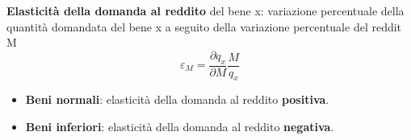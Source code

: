 \documentclass[../main.tex]{subfiles}
\begin{document}
\textbf{Elasticità della domanda al reddito} del bene x: variazione percentuale della quantità domandata del bene x a seguito della variazione percentuale del reddit M
$$\varepsilon_M=\frac{\partial q_x}{\partial M} \frac{M}{q_x}$$

\begin{itemize}
\item \textbf{Beni normali}: elasticità della domanda al reddito \textbf{positiva}.
\item \textbf{Beni inferiori}: elasticità della domanda al reddito \textbf{negativa}.
\end{itemize}
\end{document}
